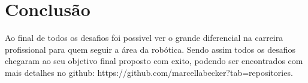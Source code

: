 \chapter{Conclusão}
\label{chap:conc}

Ao final de todos os desafios foi possivel ver o grande diferencial na carreira profissional para quem seguir a área da robótica.
Sendo assim todos os desafios chegaram ao seu objetivo final proposto com exito, podendo ser encontrados com mais detalhes no github: https://github.com/marcellabecker?tab=repositories.




